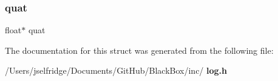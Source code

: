 \mbox{\label{structlog__ahrs__struct_aa018b130b747e4f5fcbd76f4a9b3e5e7}} 
\subsubsection{quat}
{\footnotesize\ttfamily float$\ast$ quat}



The documentation for this struct was generated from the following file\+:\begin{DoxyCompactItemize}
\item 
/\+Users/jselfridge/\+Documents/\+Git\+Hub/\+Black\+Box/inc/\textbf{ log.\+h}\end{DoxyCompactItemize}

